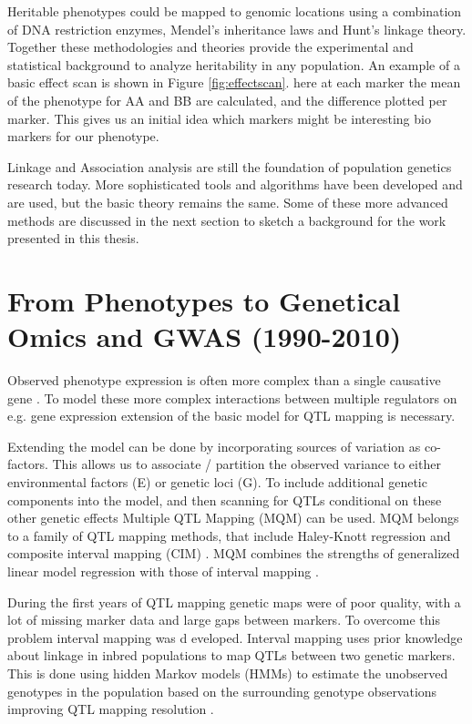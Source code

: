 Heritable phenotypes could be mapped to genomic locations using a combination of DNA 
restriction enzymes, Mendel's inheritance laws and Hunt's linkage theory. Together these 
methodologies and theories provide the experimental and statistical background to 
analyze heritability in any population. An example of a basic effect scan is shown in Figure 
\ref{fig:effectscan}. here at each marker the mean of the phenotype for AA and BB are 
calculated, and the difference plotted per marker. This gives us an initial idea which markers 
might be interesting bio markers for our phenotype. 

Linkage and Association analysis are still the foundation of population genetics research 
today. More sophisticated tools and algorithms have been developed and are used, but the 
basic theory remains the same. Some of these more advanced methods are discussed in the next 
section to sketch a background for the work presented in this thesis.

\section{From Phenotypes to Genetical Omics and GWAS (1990-2010)}

Observed phenotype expression is often more complex than a single causative gene \cite{Sinha:2006, 
West:2007}. To model these more complex interactions between multiple regulators on e.g. gene expression 
extension of the basic model for QTL mapping is necessary. 

Extending the model can be done by incorporating sources of variation as co-factors. This allows us 
to associate / partition the observed variance to either environmental factors (E) or genetic loci 
(G). To include additional genetic components into the model, and then scanning for QTLs conditional 
on these other genetic effects Multiple QTL Mapping (MQM) can be used. MQM belongs to a family 
of QTL mapping methods, that include Haley-Knott regression \cite{Haley:1992} and composite 
interval mapping (CIM) \cite{Zeng:1994}. MQM combines the strengths of generalized linear model 
regression with those of interval mapping \cite{Jansen:1993, Jansen:1994b}. 

During the first years of QTL mapping genetic maps were of poor quality, with a lot of missing 
marker data and large gaps between markers. To overcome this problem interval mapping was d
eveloped. Interval mapping uses prior knowledge about linkage in inbred populations to map QTLs 
between two genetic markers. This is done using hidden Markov models (HMMs) to estimate the 
unobserved genotypes in the population based on the surrounding genotype observations improving 
QTL mapping resolution \cite{Jansen:1993, Zeng:1994}.

